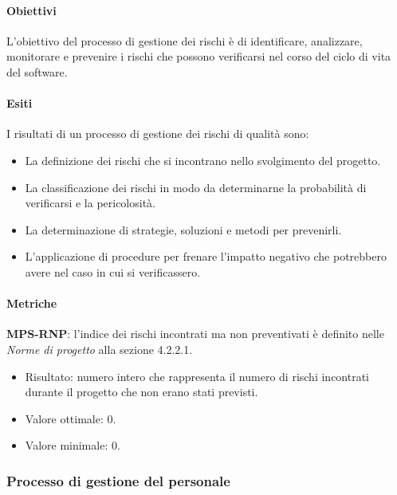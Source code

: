 \documentclass[../piano-di-qualifica.tex]{subfiles}
\begin{document}
\paragraph{Obiettivi}%
\label{par:obiettivi_rischi}

L'obiettivo del processo di gestione dei rischi è di identificare, analizzare, monitorare e prevenire i rischi che possono verificarsi nel corso del ciclo di vita del software.

\paragraph{Esiti}%
\label{par:esiti_rischi}

I risultati di un processo di gestione dei rischi di qualità sono:
\begin{itemize}
  \item La definizione dei rischi che si incontrano nello svolgimento del progetto.
  \item La classificazione dei rischi in modo da determinarne la probabilità di verificarsi e la pericolosità.
  \item La determinazione di strategie, soluzioni e metodi per prevenirli.
  \item L'applicazione di procedure per frenare l'impatto negativo che potrebbero avere nel caso in cui si verificassero.
\end{itemize}

\paragraph{Metriche}%
\label{par:metriche_rischi}

\textbf{MPS-RNP}: l'indice dei rischi incontrati ma non preventivati è definito nelle \textit{Norme di progetto} alla sezione 4.2.2.1.
\begin{itemize}
  \item Risultato: numero intero che rappresenta il numero di rischi incontrati durante il progetto che non erano stati previsti.
  \item Valore ottimale: 0.
  \item Valore minimale: 0.
\end{itemize}

\subsubsection{Processo di gestione del personale}%
\label{subs:processo_di_gestione_del_personale}
\end{document}
